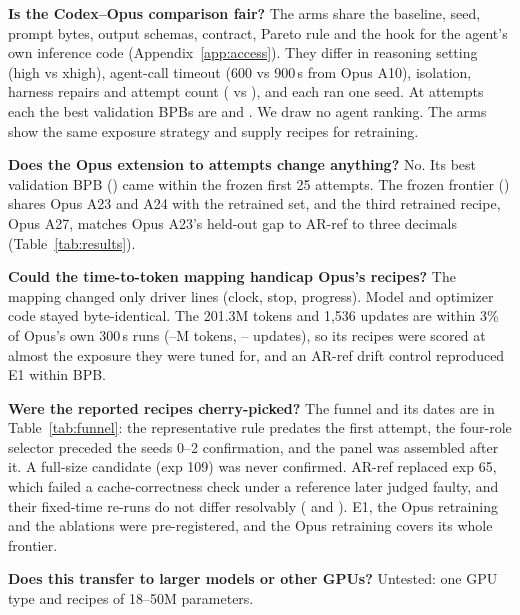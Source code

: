 \documentclass{article}
\begin{document}
\textbf{Is the Codex--Opus comparison fair?} The arms share the baseline, seed, prompt bytes, output schemas, contract, Pareto rule and the hook for the agent's own inference code (Appendix~\ref{app:access}). They differ in reasoning setting (high vs xhigh), agent-call timeout (600 vs 900\,s from Opus A10), isolation, harness repairs and attempt count (\CRCxAttempts{} vs \CROpAttempts), and each ran one seed. At \CRCxAttempts{} attempts each the best validation BPBs are \CRCxBestBPB{} and \CROpBestTwentyTwo. We draw no agent ranking. The arms show the same exposure strategy and supply recipes for retraining.

\textbf{Does the Opus extension to \CROpAttempts{} attempts change anything?} No. Its best validation BPB (\CROpBestFrozen) came within the frozen first 25 attempts. The frozen frontier (\CROpFrontierFrozen) shares Opus A23 and A24 with the retrained set, and the third retrained recipe, Opus A27, matches Opus A23's held-out gap to AR-ref to three decimals (Table~\ref{tab:results}).

\textbf{Could the time-to-token mapping handicap Opus's recipes?} The mapping changed only driver lines (clock, stop, progress). Model and optimizer code stayed byte-identical. The 201.3M tokens and 1{,}536 updates are within 3\% of Opus's own 300\,s runs (\CROpTokLo--\CROpTokHi M tokens, \CROpUpdLo--\CROpUpdHi{} updates), so its recipes were scored at almost the exposure they were tuned for, and an AR-ref drift control reproduced E1 within \CRMTDriftAbs{} BPB.

\textbf{Were the reported recipes cherry-picked?} The funnel and its dates are in Table~\ref{tab:funnel}: the representative rule predates the first attempt, the four-role selector preceded the seeds 0--2 confirmation, and the panel was assembled after it. A full-size candidate (exp 109) was never confirmed. AR-ref replaced exp 65, which failed a cache-correctness check under a reference later judged faulty, and their fixed-time re-runs do not differ resolvably (\CRFixedSixtyFive{} and \CRFixedSixtyEight). E1, the Opus retraining and the ablations were pre-registered, and the Opus retraining covers its whole frontier.

\textbf{Does this transfer to larger models or other GPUs?} Untested: one GPU type and recipes of 18--50M parameters.
\end{document}
